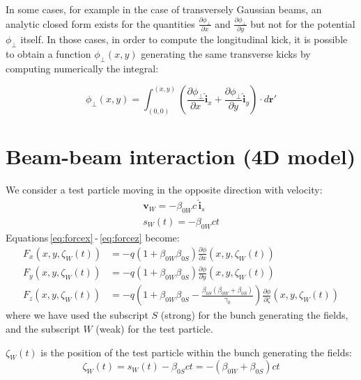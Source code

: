In some cases, for example in the case of transversely Gaussian beams, an analytic closed form exists for the quantities $\frac{\partial \phi_\perp}{\partial x}$ and $\frac{\partial \phi_\perp}{\partial y}$ but not for the potential $\phi_\perp$ itself. In those cases, in order to compute the longitudinal kick, it is possible to obtain a function $\phi_\perp (x,y)$ generating the same transverse kicks by computing numerically the integral:

\begin{equation}
\phi_\perp (x,y) = \int_{(0, 0)}^{(x, y)} 
\left(
\frac{\partial \phi_\perp}{\partial x} \mathbf{\hat{i}}_x
+
\frac{\partial \phi_\perp}{\partial y} \mathbf{\hat{i}}_y
\right)
\cdot
d\mathbf{r'}
\end{equation}



\section{Beam-beam interaction (4D model)}

We consider a test particle moving in the opposite direction with velocity:
\begin{align}
\textbf{v}_W = -\beta_{0W} c\, \hat{\textbf{i}}_s\\
s_W(t) = -\beta_{0W} ct
\end{align}
Equations\,\eqref{eq:forcex}\,-\,\eqref{eq:forcez} become:
\begin{align}
F_x(x, y, \zeta_W(t)) &=  -q(1+\beta_{0W}  \beta_{0S}) \frac{\partial \phi}{\partial x}(x, y, \zeta_W(t)) \label{eq:bbfgenx}\\
F_y(x, y, \zeta_W(t)) &=  -q(1+\beta_{0W}  \beta_{0S}) \frac{\partial \phi}{\partial y}(x, y, \zeta_W(t))\label{eq:bbfgeny}\\
F_z(x, y, \zeta_W(t)) &=  -q\left(1+\beta_{0W}  \beta_{0S} -\frac{\beta_{0S}(\beta_{0W}+\beta_{0S})}{\gamma_0}\right) \frac{\partial \phi}{\partial \zeta}(x, y, \zeta_W(t))\label{eq:bbfgenz}
\end{align}
where we have used the subscript $S$ (strong) for the bunch generating the fields, and the subscript $W$ (weak) for the test particle. 

$\zeta_W(t)$ is the position of the test particle within the bunch generating the fields: 
\begin{equation}
\zeta_W(t)= s_W(t) -\beta_{0S} c t  = -(\beta_{0W}+\beta_{0S})ct
\label{eq:zetaw}
\end{equation}


